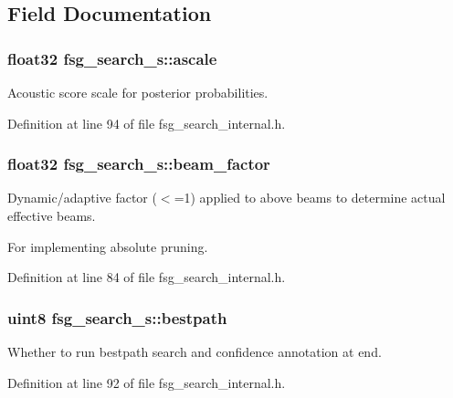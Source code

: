 \subsection{Field Documentation}
\subsubsection[{ascale}]{\setlength{\rightskip}{0pt plus 5cm}float32 fsg\-\_\-search\-\_\-s\-::ascale}\label{structfsg__search__s_a4d13fff2e14882b0125386fc27a4097f}


Acoustic score scale for posterior probabilities. 



Definition at line 94 of file fsg\-\_\-search\-\_\-internal.\-h.

\subsubsection[{beam\-\_\-factor}]{\setlength{\rightskip}{0pt plus 5cm}float32 fsg\-\_\-search\-\_\-s\-::beam\-\_\-factor}\label{structfsg__search__s_a8e86d9f82189f8429d71ee2f67ecaaa2}


Dynamic/adaptive factor ($<$=1) applied to above beams to determine actual effective beams. 

For implementing absolute pruning. 

Definition at line 84 of file fsg\-\_\-search\-\_\-internal.\-h.

\subsubsection[{bestpath}]{\setlength{\rightskip}{0pt plus 5cm}uint8 fsg\-\_\-search\-\_\-s\-::bestpath}\label{structfsg__search__s_aba7eff57919c5a1de55eab3a62ff055a}


Whether to run bestpath search and confidence annotation at end. 



Definition at line 92 of file fsg\-\_\-search\-\_\-internal.\-h.

